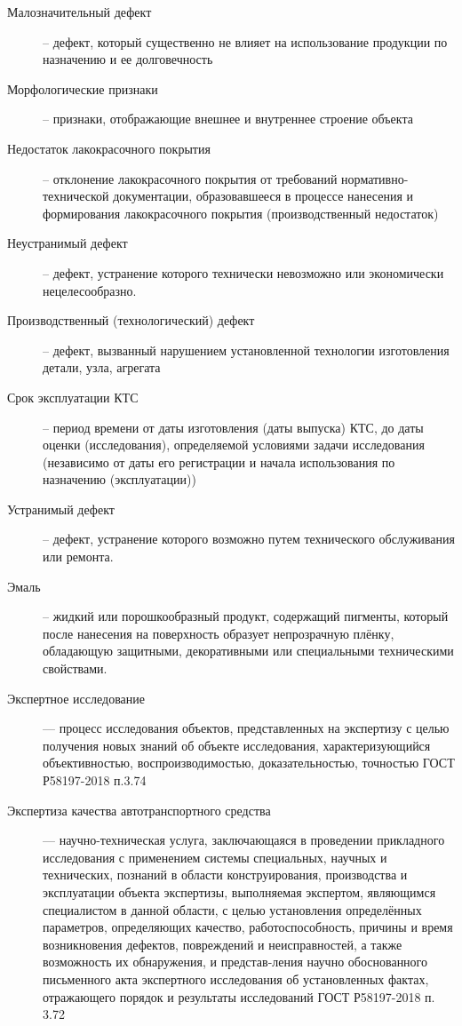 \begin{description}
\item[Малозначительный дефект] -- дефект, который существенно не влияет на использование продукции по назначению и ее долговечность
	\item[Морфологические признаки]-- признаки, отображающие внешнее и внутреннее строение объекта
	\item [Недостаток лакокрасочного покрытия] -- отклонение лакокрасочного покрытия от 	требований нормативно-технической документации, образовавшееся в процессе нанесения и
	формирования лакокрасочного покрытия (производственный недостаток)
	\item[Неустранимый дефект] -- дефект, устранение которого технически невозможно или экономически нецелесообразно.
	\item[Производственный (технологический) дефект] -- дефект, вызванный нарушением установленной технологии изготовления детали, узла, агрегата
	\item[Срок эксплуатации КТС]-- период времени от даты изготовления (даты выпуска) КТС, до даты оценки (исследования), определяемой условиями задачи исследования (независимо от даты его регистрации и начала использования по назначению (эксплуатации))
	\item[Устранимый дефект] -- дефект, устранение которого возможно путем технического
	обслуживания или ремонта.
	\item[Эмаль] -- жидкий или порошкообразный продукт, содержащий пигменты, который после
	нанесения на поверхность образует непрозрачную плёнку, обладающую защитными,
	декоративными или специальными техническими свойствами.
	
		\item[Экспертное исследование] --- процесс исследования объектов, представленных на экспертизу с целью получения новых знаний об объекте исследования, характеризующийся объективностью, воспроизводимостью, доказательностью, точностью ГОСТ Р58197-2018 п.3.74
	
	
	\item[Экспертиза качества автотранспортного средства] --- научно-техническая услуга, заключающаяся в проведении прикладного исследования с применением системы специальных, научных и технических, познаний в области конструирования, производства и эксплуатации объекта экспертизы, выполняемая экспертом, являющимся специалистом в данной области, с целью установления определённых параметров, определяющих качество, работоспособность, причины и время возникновения дефектов, повреждений и неисправностей, а также возможность их обнаружения, и представ-ления научно обоснованного письменного акта экспертного исследования об установленных фактах, отражающего порядок и результаты исследований ГОСТ Р58197-2018 п. 3.72
	

\end{description}

